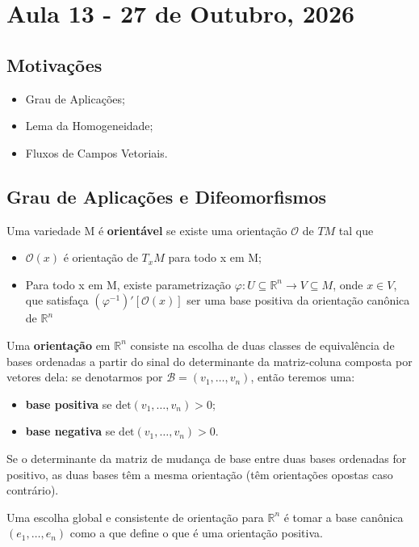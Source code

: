 \documentclass[../differential_topology.tex]{subfiles}
\begin{document}
\section{Aula 13 - 27 de Outubro, 2026}
\subsection{Motivações}
\begin{itemize}
	\item Grau de Aplicações;
	\item Lema da Homogeneidade;
	\item Fluxos de Campos Vetoriais.
\end{itemize}
\subsection{Grau de Aplicações e Difeomorfismos}
\begin{def*}
	Uma variedade M é \textbf{orientável} se existe uma orientação \(\mathcal{O}\) de \(TM\) tal que
	\begin{itemize}
		\item \(\mathcal{O}(x)\) é orientação de \(T_{x}M\) para todo x em M;
		\item Para todo x em M, existe parametrização \(\varphi :U\subseteq \mathbb{R}^{n}\rightarrow V \subseteq M\), onde \(x\in V\), que satisfaça \((\varphi^{-1})'[\mathcal{O}(x)]\) ser uma base positiva da orientação canônica de \(\mathbb{R}^{n}\)
	\end{itemize}
\end{def*}

\begin{tcolorbox}[
		skin=enhanced,
		title=Lembrete!,
		after title={\hfill Orientabilidade},
		fonttitle=\bfseries,
		sharp corners=downhill,
		colframe=black,
		colbacktitle=yellow!75!white,
		colback=yellow!30,
		colbacklower=black,
		coltitle=black,
		drop large lifted shadow
	]
	Uma \textbf{orientação} em \(\mathbb{R}^{n}\) consiste na escolha de duas classes de equivalência de bases ordenadas a partir do sinal do determinante da matriz-coluna composta por vetores dela: se denotarmos por \(\mathcal{B} = (v_1, \dotsc , v_{n})\), então teremos uma:
	\begin{itemize}
		\item \textbf{base positiva} se \(\mathrm{det}(v_1, \dotsc , v_{n}) > 0\);
		\item \textbf{base negativa} se \(\mathrm{det}(v_1, \dotsc , v_{n}) > 0\).
	\end{itemize}
	Se o determinante da matriz de mudança de base entre duas bases ordenadas for positivo, as duas bases têm a mesma orientação (têm orientações opostas caso contrário).

	Uma escolha global e consistente de orientação para \(\mathbb{R}^{n}\) é tomar a base canônica \((e_1, \dotsc , e_{n})\) como a que define o que é uma orientação positiva.
\end{tcolorbox}
\end{document}
